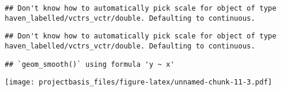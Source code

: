 \documentclass[
]{article}
\begin{document}
\begin{verbatim}
## Don't know how to automatically pick scale for object of type haven_labelled/vctrs_vctr/double. Defaulting to continuous.
\end{verbatim}

\begin{verbatim}
## Don't know how to automatically pick scale for object of type haven_labelled/vctrs_vctr/double. Defaulting to continuous.
\end{verbatim}

\begin{verbatim}
## `geom_smooth()` using formula 'y ~ x'
\end{verbatim}

\texttt{[image: projectbasis\_files/figure-latex/unnamed-chunk-11-3.pdf]}
\end{document}

